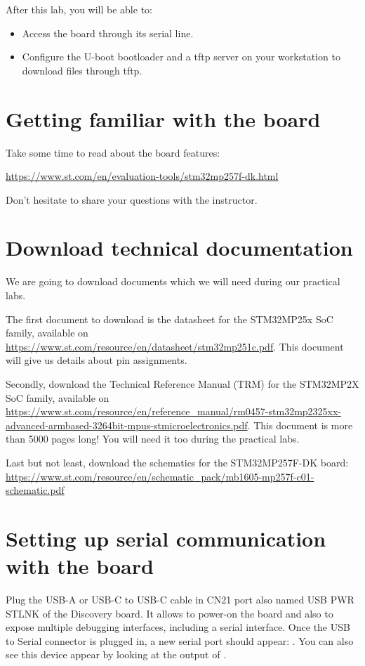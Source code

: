 
After this lab, you will be able to:
\begin{itemize}
\item Access the board through its serial line.
\item Configure the U-boot bootloader and a tftp server
      on your workstation to download files through tftp.
\end{itemize}

\section{Getting familiar with the board}

Take some time to read about the board features:

\url{https://www.st.com/en/evaluation-tools/stm32mp257f-dk.html}

Don't hesitate to share your questions with the instructor.

\section{Download technical documentation}

We are going to download documents which we will need during our
practical labs.


The first document to download is the datasheet for the
STM32MP25x SoC family, available on
\url{https://www.st.com/resource/en/datasheet/stm32mp251c.pdf}. 
This document will give us details about pin assignments.

Secondly, download the Technical Reference Manual (TRM) for
the STM32MP2X SoC family, available on
\url{https://www.st.com/resource/en/reference_manual/rm0457-stm32mp2325xx-advanced-armbased-3264bit-mpus-stmicroelectronics.pdf}.
This document is more than 5000 pages long!
You will need it too during the practical labs.

Last but not least, download the schematics for the STM32MP257F-DK board:
\url{https://www.st.com/resource/en/schematic_pack/mb1605-mp257f-c01-schematic.pdf}

\section{Setting up serial communication with the board}

Plug the USB-A or USB-C to USB-C cable in CN21 port also named USB PWR STLNK
of the Discovery board. It allows to power-on the board and also to expose
multiple debugging interfaces, including a serial interface.
Once the USB to Serial connector is plugged in, a new serial port
should appear: .  You can also see this device
appear by looking at the output of .

